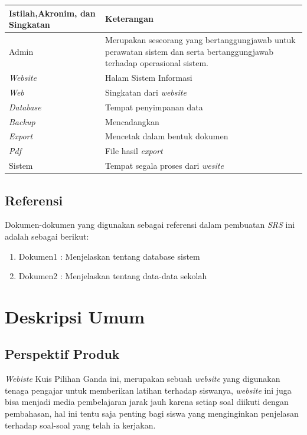 \documentclass{scrreprt}
\begin{document}
\begin{center}
	\begin{tabular}{|>{\centering\arraybackslash}m{5cm}|>{\centering\arraybackslash}m{9cm}|}
		\hline
			Istilah,Akronim, dan Singkatan & Keterangan\\
		\hline
			Admin & Merupakan seseorang yang bertanggungjawab untuk perawatan sistem dan  serta bertanggungjawab terhadap operasional sistem.\\
		\hline
			\emph{Website} & Halam Sistem Informasi\\
		\hline
			\emph{Web} & Singkatan dari \emph{website}\\
		\hline
			\emph{Database} & Tempat penyimpanan data\\
		\hline
			\emph{Backup} &Mencadangkan \\
		\hline
			\emph{Export} & Mencetak dalam bentuk dokumen\\
		\hline
			\emph{Pdf} & File hasil \emph{export}\\
		\hline
			Sistem & Tempat segala proses dari \emph{wesite}\\
		\hline
	\end{tabular}
\end{center}



\section{Referensi}
Dokumen-dokumen yang digunakan sebagai referensi dalam pembuatan \emph{SRS} ini adalah sebagai berikut:

\begin{enumerate}
	\item Dokumen1 : Menjelaskan tentang database sistem
	\item Dokumen2 : Menjelaskan tentang data-data sekolah
\end{enumerate}




\chapter{Deskripsi Umum}

\section{Perspektif Produk}
\emph{Webiste} Kuis Pilihan Ganda ini, merupakan sebuah \emph{website} yang digunakan tenaga pengajar untuk memberikan latihan terhadap siswanya, \emph{website} ini juga bisa menjadi media pembelajaran jarak jauh karena setiap soal diikuti dengan pembahasan, hal ini tentu saja penting bagi siswa yang menginginkan penjelasan terhadap soal-soal yang telah ia kerjakan.
\end{document}
